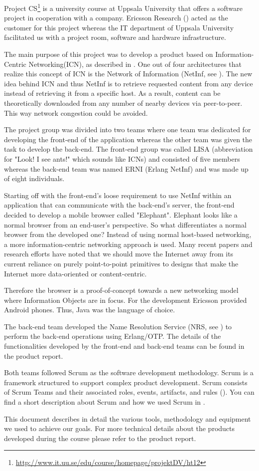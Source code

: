 Project CS\footnote{\url{http://www.it.uu.se/edu/course/homepage/projektDV/ht12}} is a university
course at Uppsala University that offers a software project in cooperation with a company. Ericsson Research (\cite{ericsson}) acted as 
the customer for this project whereas the IT department of Uppsala University facilitated us with a project room, software and hardware infrastructure.

The main purpose of this project was to develop a product based on Information-Centric Networking(ICN), as described in \cite{netinf}.
One out of four architectures that realize this concept of ICN is the Network of Information (NetInf, see \cite{netinf}). 
The new idea behind ICN and thus NetInf is to retrieve requested content from any device  instead of retrieving it from a specific host. 
As a result, content can be theoretically downloaded from any number of nearby devices via peer-to-peer. 
This way network congestion could be avoided.

The project group was divided into two teams where one team was dedicated for developing the front-end of the 
application whereas the other team was given the task to develop the back-end. The front-end group was called 
LISA (abbreviation for "Look! I see ants!" which sounds like ICNs) and consisted of five members whereas 
the back-end team was named ERNI (Erlang NetInf) and was made up of eight individuals. 

Starting off with the front-end's loose requirement to use NetInf within an application that can communicate with
the back-end's server, the front-end decided to develop a mobile browser called "Elephant". 
Elephant looks like a normal browser from an end-user's perspective. So what differentiates a 
normal browser from the developed one? Instead of using normal host-based networking, a more information-centric networking approach is used. 
Many recent papers and research efforts have noted that we should move the Internet 
away from its current reliance on purely point-to-point primitives to designs that make the Internet more data-oriented or content-centric. \cite{ghodsietal}  

Therefore the browser is a proof-of-concept towards a new networking model where Information Objects are in focus.
For the development Ericsson provided Android phones. Thus, Java was the language of choice.

The back-end team developed the Name Resolution Service (NRS, see \cite{netinf}) to perform the back-end operations using Erlang/OTP\cite{erlang}. 
The details of the functionalities developed 
by the front-end and back-end teams can be found in the product report. 

Both teams followed Scrum as the software development methodology. Scrum is a framework structured to support complex product development. Scrum consists of
Scrum Teams and their associated roles, events, artifacts, and rules (\cite{scrumpaper}).
You can find a short description about Scrum and
how we used Scrum in .

This document describes in detail the various tools, methodology and equipment we used to achieve our goals. For more technical details about the products developed during the course please refer to the product report\cite{product-report}.
